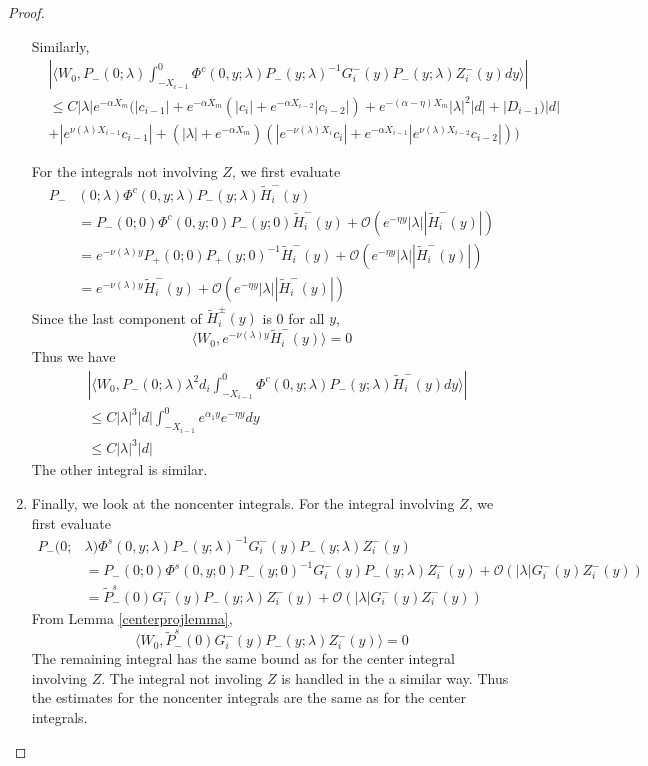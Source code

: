 \documentclass[thesis.tex]{subfiles}
\begin{document}
\begin{lemma}
\begin{proof}
\begin{enumerate}
Similarly,
\begin{align*}
&\left| \langle W_0, P_-(0; \lambda) \int_{-X_{i-1}}^0 \Phi^c(0, y; \lambda) P_-(y; \lambda)^{-1} G_i^-(y) P_-(y; \lambda)Z_i^-(y) dy \rangle \right| \\
&\leq C |\lambda| e^{-\alpha X_m} \Big(|c_{i-1}| + e^{-\alpha X_m}(|c_i| + e^{-\alpha X_{i-2}} |c_{i-2}|) + e^{-(\alpha - \eta) X_m}|\lambda|^2|d| + |D_{i-1})|d| \\
&+ |e^{\nu(\lambda)X_{i-1}}c_{i-1}| + (|\lambda| + e^{-\alpha X_m})(|e^{-\nu(\lambda)X_i} c_i| + e^{-\alpha X_{i-1}} |e^{\nu(\lambda)X_{i-2}} c_{i-2}|)\Big)
\end{align*}

For the integrals not involving $Z$, we first evaluate
\begin{align*}
P_-&(0; \lambda) \Phi^c(0, y; \lambda) P_-(y; \lambda) \tilde{H}_i^-(y) \\
&= P_-(0; 0) \Phi^c(0, y; 0) P_-(y; 0) \tilde{H}_i^-(y) + \mathcal{O}(e^{-\eta y}|\lambda||\tilde{H}_i^-(y)|) \\
&= e^{-\nu(\lambda) y} P_+(0; 0) P_+(y; 0)^{-1}\tilde{H}_i^-(y) + \mathcal{O}(e^{-\eta y}|\lambda||\tilde{H}_i^-(y)|)  \\
&= e^{-\nu(\lambda) y} \tilde{H}_i^-(y) + \mathcal{O}(e^{-\eta y}|\lambda||\tilde{H}_i^-(y)|) 
\end{align*}
Since the last component of $\tilde{H}_i^\pm(y)$ is 0 for all $y$,
\[
\langle W_0, e^{-\nu(\lambda) y} \tilde{H}_i^-(y) \rangle = 0
\]
Thus we have
\begin{align*}
&\left| \langle W_0, P_-(0; \lambda) \lambda^2 d_i \int_{-X_{i-1}}^0 \Phi^c(0, y; \lambda) P_-(y; \lambda) \tilde{H}_i^-(y) dy \rangle \right| \\
&\leq C |\lambda|^3 |d| \int_{-X_{i-1}}^0 e^{\alpha_1 y} e^{-\eta y} dy \\
&\leq C |\lambda|^3 |d| 
\end{align*}
The other integral is similar.

\item Finally, we look at the noncenter integrals. For the integral involving $Z$, we first evaluate 
\begin{align*}
P_-(0; &\lambda) \Phi^s(0, y; \lambda) P_-(y; \lambda)^{-1} G_i^-(y) P_-(y; \lambda)Z_i^-(y) \\
&= P_-(0; 0) \Phi^s(0, y; 0) P_-(y; 0)^{-1}G_i^-(y) P_-(y; \lambda)Z_i^-(y) + \mathcal{O}(|\lambda| G_i^-(y) Z_i^-(y)) \\
&= \tilde{P}_-^s(0)G_i^-(y) P_-(y; \lambda)Z_i^-(y) + \mathcal{O}(|\lambda| G_i^-(y) Z_i^-(y))
\end{align*}
From Lemma \ref{centerprojlemma},
\[
\langle W_0, \tilde{P}_-^s(0)G_i^-(y) P_-(y; \lambda)Z_i^-(y) \rangle = 0
\]
The remaining integral has the same bound as for the center integral involving $Z$. The integral not involing $Z$ is handled in the a similar way. Thus the estimates for the noncenter integrals are the same as for the center integrals.


\end{enumerate}
\end{proof}
\end{lemma}
\end{document}
